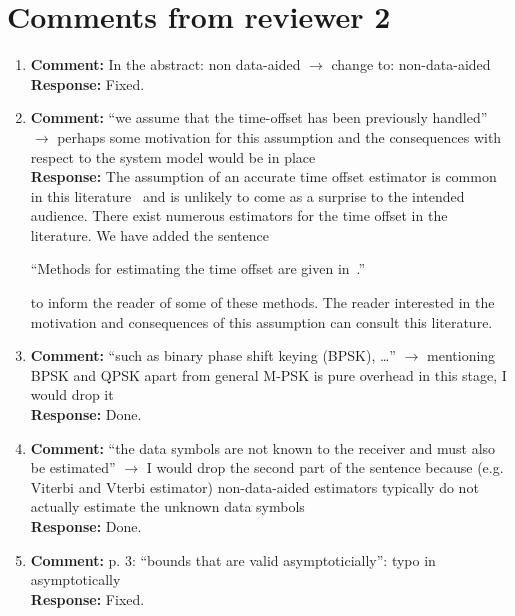 \documentclass{article}
\begin{document}
\section{Comments from reviewer 2}

\begin{enumerate}

\item \textbf{Comment:} In the abstract: non data-aided $\to$ change to: non-data-aided \\
\textbf{Response:} Fixed.

\item \textbf{Comment:} ``we assume that the time-offset has been previously handled'' $\to$ perhaps some motivation for this assumption and the consequences with respect to the system model would be in place \\
\textbf{Response:}  The assumption of an accurate time offset estimator is common in this literature~\cite{ViterbiViterbi_phase_est_1983,Cowley_ref_sym_carr_1998,Wilson1989,Makrakis1990,Liu1991,Mackenthun1994,Sweldens2001,McKilliamLinearTimeBlockPSK2009,Divsalar1990} and is unlikely to come as a surprise to the intended audience.  There exist numerous estimators for the time offset in the literature.  We have added the sentence 

``Methods for estimating the time offset are given in~\cite{Massey1972optimumframe,Oerder_synch_square_circstat_2008,McKilliam_time_offset_pilots_data_2013}.'' 

to inform the reader of some of these methods.  The reader interested in the motivation and consequences of this assumption can consult this literature.


\item \textbf{Comment:} ``such as binary phase shift keying (BPSK), \dots'' $\to$ mentioning BPSK and QPSK apart from general M-PSK is pure overhead in this stage, I would drop it \\
\textbf{Response:} Done.

\item \textbf{Comment:} ``the data symbols are not known to the receiver and must also be estimated'' $\to$ I would drop the second part of the sentence because (e.g. Viterbi and Vterbi estimator) non-data-aided estimators typically do not actually estimate the unknown data symbols \\
\textbf{Response:} Done.

\item \textbf{Comment:} p. 3: ``bounds that are valid asymptoticially'': typo in asymptotically \\
\textbf{Response:} Fixed.


\end{enumerate}
\end{document}
